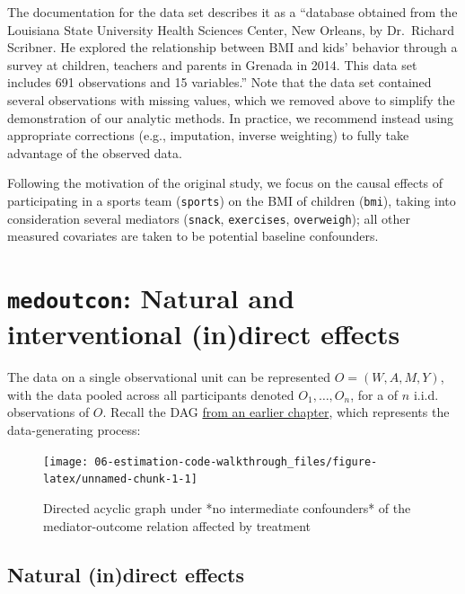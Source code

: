 \documentclass[
  12pt,
]{book}
\newcommand{\passthrough}[1]{#1}
\theoremstyle{definition}
\theoremstyle{definition}
\theoremstyle{definition}
\newcommand{\1}{\mathbbm{1}}
\begin{document}
The documentation for the data set describes it as a ``database obtained from the
Louisiana State University Health Sciences Center, New Orleans, by Dr.~Richard
Scribner. He explored the relationship between BMI and kids' behavior through a
survey at children, teachers and parents in Grenada in 2014. This data set
includes 691 observations and 15 variables.'' Note that the data set contained
several observations with missing values, which we removed above to simplify the
demonstration of our analytic methods. In practice, we recommend instead using
appropriate corrections (e.g., imputation, inverse weighting) to fully take
advantage of the observed data.

Following the motivation of the original study, we focus on the causal effects
of participating in a sports team (\passthrough{\lstinline!sports!}) on the BMI of children (\passthrough{\lstinline!bmi!}),
taking into consideration several mediators (\passthrough{\lstinline!snack!}, \passthrough{\lstinline!exercises!}, \passthrough{\lstinline!overweigh!});
all other measured covariates are taken to be potential baseline confounders.

\hypertarget{medoutcon-natural-and-interventional-indirect-effects}{%
\section{\texorpdfstring{\texttt{medoutcon}: Natural and interventional (in)direct effects}{medoutcon: Natural and interventional (in)direct effects}}\label{medoutcon-natural-and-interventional-indirect-effects}}

The data on a single observational unit can be represented \(O = (W, A, M, Y)\),
with the data pooled across all participants denoted \(O_1, \ldots, O_n\), for a
of \(n\) i.i.d. observations of \(O\). Recall the DAG \protect\hyperlink{estimands}{from an earlier
chapter}, which represents the data-generating process:

\begin{figure}

{\centering \texttt{[image: 06-estimation-code-walkthrough\_files/figure-latex/unnamed-chunk-1-1]} 

}

\caption{Directed acyclic graph under *no intermediate confounders* of the mediator-outcome relation affected by treatment}\label{fig:unnamed-chunk-1}
\end{figure}

\hypertarget{natural-indirect-effects}{%
\subsection{Natural (in)direct effects}\label{natural-indirect-effects}}
\end{document}

